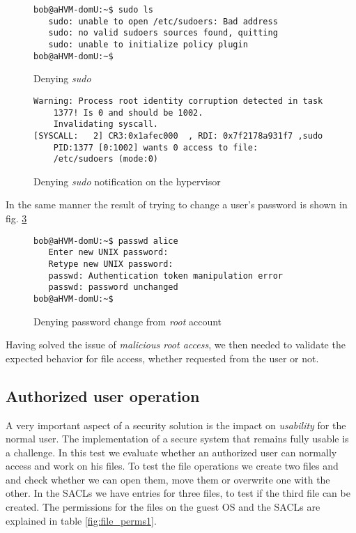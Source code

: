 \begin{figure}[ht]
	\centering
	\footnotesize{\selectfont 
		\begin{lstlisting}
bob@aHVM-domU:~$ sudo ls
   sudo: unable to open /etc/sudoers: Bad address
   sudo: no valid sudoers sources found, quitting
   sudo: unable to initialize policy plugin
bob@aHVM-domU:~$
		\end{lstlisting}}
	\caption{Denying \emph{sudo}}
	\label{fig:sudo_deny}
\end{figure}

\begin{figure}[ht]
	\centering
	\footnotesize{\selectfont 
		\begin{lstlisting}
Warning: Process root identity corruption detected in task 
	1377! Is 0 and should be 1002. 
	Invalidating syscall.
[SYSCALL:   2] CR3:0x1afec000  , RDI: 0x7f2178a931f7 ,sudo 
	PID:1377 [0:1002] wants 0 access to file: 
	/etc/sudoers (mode:0)
		\end{lstlisting}}
	\caption{Denying \emph{sudo} notification on the hypervisor}
	\label{fig:sudo_deny_not}
\end{figure}

\par In the same manner the result of trying to change a user's password is shown in fig. \ref{fig:passwd_deny}

\begin{figure}[ht]
	\centering
	\footnotesize{\selectfont 
		\begin{lstlisting}
bob@aHVM-domU:~$ passwd alice
   Enter new UNIX password:
   Retype new UNIX password:
   passwd: Authentication token manipulation error
   passwd: password unchanged
bob@aHVM-domU:~$
		\end{lstlisting}}
	\caption{Denying password change from \emph{root} account}
	\label{fig:passwd_deny}
\end{figure}


\par Having solved the issue of \emph{malicious root access}, we then needed to validate the expected behavior for file access, whether requested from the  user or not.

\subsection{Authorized user operation}

\par A very important aspect of a security solution is the impact on \emph{usability} for the normal user. The implementation of a secure system that remains fully usable is a challenge. In this test we evaluate whether an authorized user can normally access and work on his files. To test the file operations we create two files  and  and check whether we can open them, move them or overwrite one with the other. In the \acp{SACL} we have entries for three files, to test if the third file can be created. The permissions for the files on the guest \ac{OS} and the \acp{SACL} are explained in table \ref{fig:file_perms1}.

